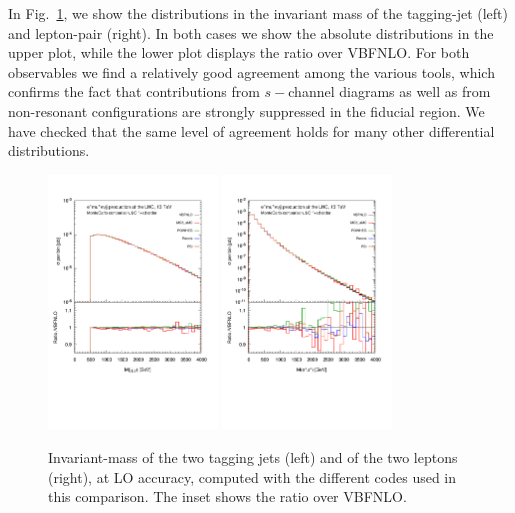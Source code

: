In Fig.~\ref{fig:wg1_mjj-llLO}, we show the distributions in the invariant mass of the tagging-jet (left) and lepton-pair (right).
In both cases we show the absolute distributions in the upper plot, while the lower plot displays the ratio over {\sc VBFNLO}.
For both observables we find a relatively good agreement among the various tools, which confirms the fact that contributions from $s-$channel diagrams as well as from non-resonant configurations are strongly suppressed in the fiducial region.
We have checked that the same level of agreement holds for many other differential distributions.


 \begin{figure}[h!]
   \centering
   \includegraphics[width=0.4\textwidth,angle=0,clip=true,trim={0.4cm 2.5cm 0.cm 1.cm}]{figures/mjj_LO.pdf}
   \includegraphics[width=0.4\textwidth,angle=0,clip=true,trim={0.4cm 2.5cm 0.cm 1.cm}]{figures/mll_LO.pdf}
\caption{\label{fig:wg1_mjj-llLO} Invariant-mass of the two tagging jets (left) and of the two leptons (right), at LO accuracy, 
computed with the different codes used in this comparison. The inset shows the ratio over {\sc VBFNLO}.
}
\end{figure}
